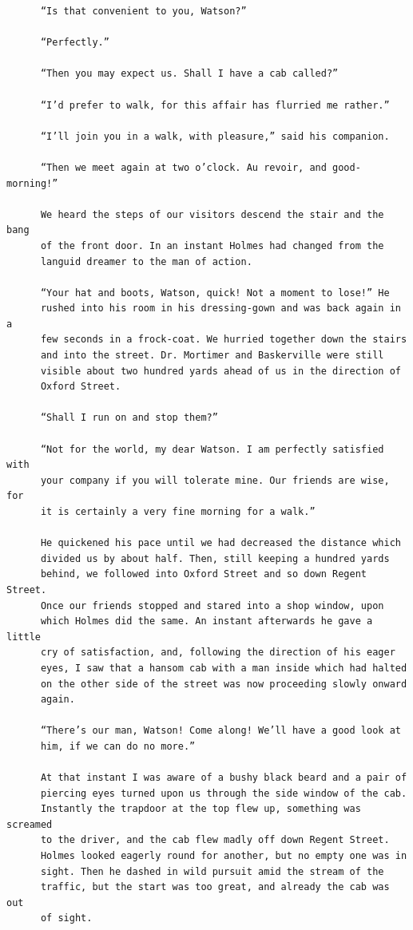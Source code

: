 \documentclass{article}
\begin{document}
\begin{verbatim}
      “Is that convenient to you, Watson?”

      “Perfectly.”

      “Then you may expect us. Shall I have a cab called?”

      “I’d prefer to walk, for this affair has flurried me rather.”

      “I’ll join you in a walk, with pleasure,” said his companion.

      “Then we meet again at two o’clock. Au revoir, and good-morning!”

      We heard the steps of our visitors descend the stair and the bang
      of the front door. In an instant Holmes had changed from the
      languid dreamer to the man of action.

      “Your hat and boots, Watson, quick! Not a moment to lose!” He
      rushed into his room in his dressing-gown and was back again in a
      few seconds in a frock-coat. We hurried together down the stairs
      and into the street. Dr. Mortimer and Baskerville were still
      visible about two hundred yards ahead of us in the direction of
      Oxford Street.

      “Shall I run on and stop them?”

      “Not for the world, my dear Watson. I am perfectly satisfied with
      your company if you will tolerate mine. Our friends are wise, for
      it is certainly a very fine morning for a walk.”

      He quickened his pace until we had decreased the distance which
      divided us by about half. Then, still keeping a hundred yards
      behind, we followed into Oxford Street and so down Regent Street.
      Once our friends stopped and stared into a shop window, upon
      which Holmes did the same. An instant afterwards he gave a little
      cry of satisfaction, and, following the direction of his eager
      eyes, I saw that a hansom cab with a man inside which had halted
      on the other side of the street was now proceeding slowly onward
      again.

      “There’s our man, Watson! Come along! We’ll have a good look at
      him, if we can do no more.”

      At that instant I was aware of a bushy black beard and a pair of
      piercing eyes turned upon us through the side window of the cab.
      Instantly the trapdoor at the top flew up, something was screamed
      to the driver, and the cab flew madly off down Regent Street.
      Holmes looked eagerly round for another, but no empty one was in
      sight. Then he dashed in wild pursuit amid the stream of the
      traffic, but the start was too great, and already the cab was out
      of sight.


\end{verbatim}
\end{document}
